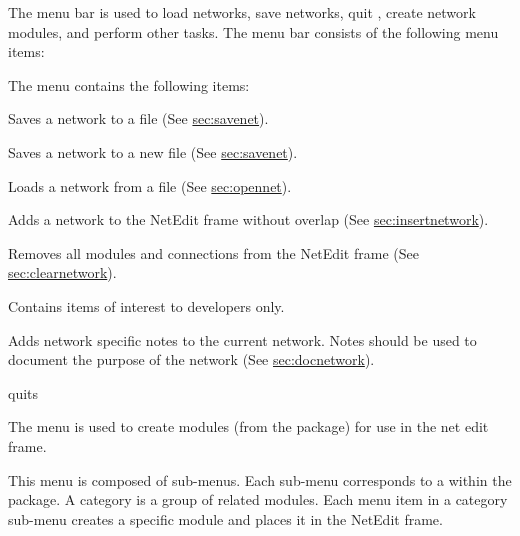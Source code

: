 \begin{description}
   The menu bar is used to load networks, save
  networks, quit \sr{}, create network modules, and perform other
  tasks.  The menu bar consists of the following menu items:

  \begin{description}
     The  menu contains the following items:

    \begin{description}
       Saves a network to a file (See \hyperref{this
        section}{Section~}{}{sec:savenet}).

       Saves a network to a new file (See
      \hyperref{this section}{Section~}{}{sec:savenet}).
      
       Loads a network from a file (See
      \hyperref{this section}{Section~}{}{sec:opennet}).
      
       Adds a network to the NetEdit frame
      without overlap (See \hyperref{this
        section}{Section~}{}{sec:insertnetwork}).
      
       Removes all modules and connections from
      the NetEdit frame (See \hyperref{this
        section}{Section~}{}{sec:clearnetwork}).
      
       Contains items of interest to
      developers only.
      
       Adds network specific
      notes to the current network.  Notes should be used to document
      the purpose of the network (See \hyperref{this
        section}{Section~}{}{sec:docnetwork}).
    
       quits \sr{}
    \end{description}
  \end{description}
  
  \begin{description}
     The  menu is used to create modules
    (from the \sr{} package) for use in the net edit frame.

    This menu is composed of sub-menus. Each sub-menu corresponds to
     a 
     within the \sr{} package.  A category is a group of
    related modules.  Each menu item in a category sub-menu creates a
    specific module and places it in the NetEdit frame.  
    

\end{description}
\end{description}
